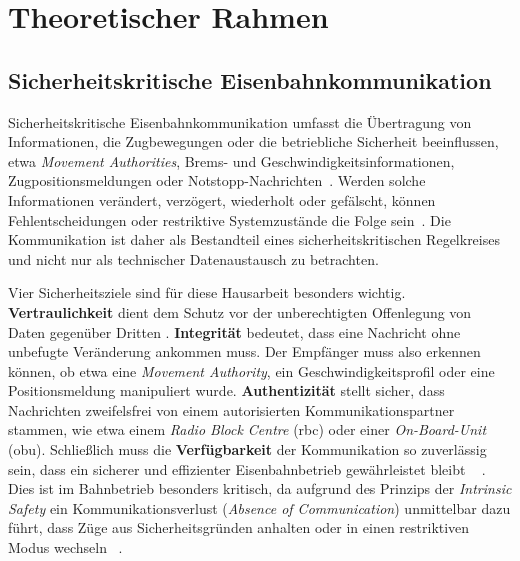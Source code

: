 \documentclass[runningheads]{res/llncs}
\begin{document}
\section{Theoretischer Rahmen}
\label{sec:Theoretischer_Rahmen}

\subsection{Sicherheitskritische Eisenbahnkommunikation}
\label{sec:Sicherheitskritische_Eisenbahnkommunikation}

Sicherheitskritische Eisenbahnkommunikation umfasst die Übertragung von Informationen, die Zugbewegungen oder die betriebliche Sicherheit beeinflussen, etwa \textit{Movement Authorities}, Brems- und Geschwindigkeitsinformationen, Zugpositionsmeldungen oder Notstopp-Nachrichten~\parencite[S. 120–121]{trinckaufETCS2024}. Werden solche Informationen verändert, verzögert, wiederholt oder gefälscht, können Fehlentscheidungen oder restriktive Systemzustände die Folge sein~\parencite[S. 17]{iwamotoTrain2024}. Die Kommunikation ist daher als Bestandteil eines sicherheitskritischen Regelkreises und nicht nur als technischer Datenaustausch zu betrachten.

Vier Sicherheitsziele sind für diese Hausarbeit besonders wichtig. \textbf{Vertraulichkeit} dient dem Schutz vor der unberechtigten Offenlegung von Daten gegenüber Dritten 
. \textbf{Integrität} bedeutet, dass eine Nachricht ohne unbefugte Veränderung ankommen muss. Der Empfänger muss also erkennen können, ob etwa eine \textit{Movement Authority}, ein Geschwindigkeitsprofil oder eine Positionsmeldung manipuliert wurde.
\textbf{Authentizität} stellt sicher, dass Nachrichten zweifelsfrei von einem autorisierten Kommunikationspartner stammen, wie etwa einem \textit{Radio Block Centre} (\gls{rbc}) oder einer \textit{On-Board-Unit} (\gls{obu}).
Schließlich muss die \textbf{Verfügbarkeit} der Kommunikation so zuverlässig sein, dass ein sicherer und effizienter Eisenbahnbetrieb gewährleistet bleibt 
\unskip~\parencite[S. 207]{trinckaufETCS2024}
. Dies ist im Bahnbetrieb besonders kritisch, da aufgrund des Prinzips der \textit{Intrinsic Safety} ein Kommunikationsverlust (\textit{Absence of Communication}) unmittelbar dazu führt, dass Züge aus Sicherheitsgründen anhalten oder in einen restriktiven Modus wechseln 
\unskip~\parencite[S. 56]{gaggeroSurvey2024}.
\end{document}
